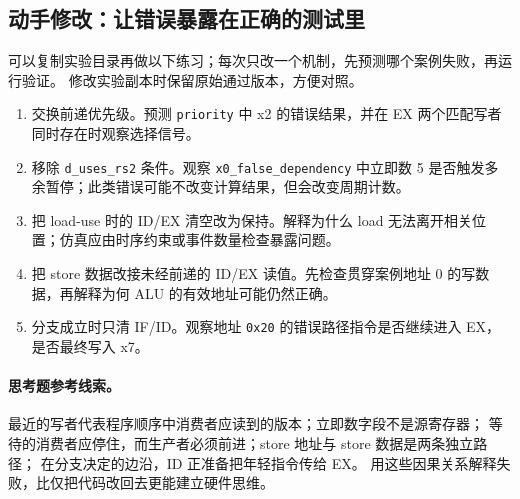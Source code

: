 \subsection{动手修改：让错误暴露在正确的测试里}

可以复制实验目录再做以下练习；每次只改一个机制，先预测哪个案例失败，再运行验证。
修改实验副本时保留原始通过版本，方便对照。
\begin{enumerate}
\item 交换前递优先级。预测 \texttt{priority} 中 x2 的错误结果，并在 EX 两个匹配写者同时存在时观察选择信号。
\item 移除 \texttt{d\_uses\_rs2} 条件。观察 \texttt{x0\_false\_dependency} 中立即数 5 是否触发多余暂停；此类错误可能不改变计算结果，但会改变周期计数。
\item 把 load-use 时的 ID/EX 清空改为保持。解释为什么 load 无法离开相关位置；仿真应由时序约束或事件数量检查暴露问题。
\item 把 store 数据改接未经前递的 ID/EX 读值。先检查贯穿案例地址 0 的写数据，再解释为何 ALU 的有效地址可能仍然正确。
\item 分支成立时只清 IF/ID。观察地址 \texttt{0x20} 的错误路径指令是否继续进入 EX，是否最终写入 x7。
\end{enumerate}

\paragraph{思考题参考线索。}
最近的写者代表程序顺序中消费者应读到的版本；立即数字段不是源寄存器；
等待的消费者应停住，而生产者必须前进；store 地址与 store 数据是两条独立路径；
在分支决定的边沿，ID 正准备把年轻指令传给 EX。
用这些因果关系解释失败，比仅把代码改回去更能建立硬件思维。

